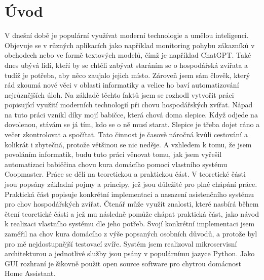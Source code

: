\chapter{Úvod}\label{ch:uvod}
V dnešní době je populární využívat moderní technologie a umělou inteligenci.
Objevuje se v různých aplikacích jako například monitoring pohybu zákazníků v obchodech nebo ve formě textových modelů, čímž je například ChatGPT.
Také dnes ubývá lidí, kteří by se chtěli zabývat staráním se o hospodářská zvířata a tudíž je potřeba, aby něco zaujalo jejich místo.
Zároveň jsem sám člověk, který rád zkoumá nové věci v oblasti informatiky a velice ho baví automatizování nejrůznějších úloh.
Na základě těchto faktů jsem se rozhodl vytvořit práci popisující využití moderních technologií při chovu hospodářských zvířat.
Nápad na tuto práci vznikl díky mojí babičce, která chová doma slepice.
Když odjede na dovolenou, stávám se já tím, kdo se o ně musí starat.
Slepice je třeba dojet ráno a večer zkontrolovat a spočítat.
Tato činnost je časově náročná kvůli cestování a kolikrát i zbytečná, protože většinou se nic neděje.
A vzhledem k tomu, že jsem povoláním informatik, budu tuto práci věnovat tomu, jak jsem vyřešil automatizaci babiččina chovu kura domácího pomocí vlastního systému Coopmaster.
\newline
Práce se dělí na teoretickou a praktickou část.
V teoretické části jsou popsány základní pojmy a principy, jež jsou důležité pro plné chápání práce.
Praktická část popisuje konkrétní implementaci a nasazení asistenčního systému pro chov hospodářských zvířat.
Čtenář může využít znalosti, které nasbírá během čtení teoretické části a jež mu následně pomůže chápat praktická část, jako návod k realizaci vlastního systému dle jeho potřeb.
\newline
Svojí konkrétní implementaci jsem zaměřil na chov kura domácího z výše popsaných osobních důvodů, a protože byl pro mě nejdostupnější testovací zvíře.
Systém jsem realizoval mikroservisní architekturou a jednotlivé služby jsou psány v populárnímu jazyce Python.
Jako GUI rozhraní je šikovně použit open source software pro chytrou domácnost Home Assistant.